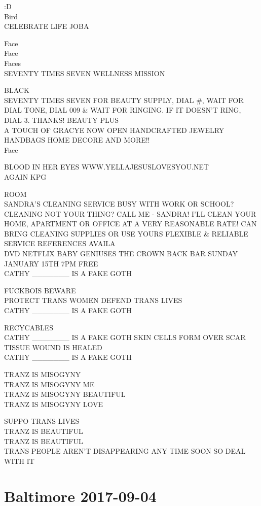 \documentclass[10pt,letterpaper]{article}
\begin{document}
:D\\
Bird\\
CELEBRATE LIFE JOBA

Face\\
Face\\
Faces\\
SEVENTY TIMES SEVEN WELLNESS MISSION

BLACK\\
SEVENTY TIMES SEVEN FOR BEAUTY SUPPLY, DIAL \#, WAIT FOR DIAL TONE, DIAL 009 \& WAIT FOR RINGING.  IF IT DOESN'T RING, DIAL 3.  THANKS!  BEAUTY PLUS\\
A TOUCH OF GRACYE NOW OPEN HANDCRAFTED JEWELRY HANDBAGS HOME DECORE AND MORE!!\\
Face

BLOOD IN HER EYES WWW.YELLAJESUSLOVESYOU.NET\\
AGAIN KPG

ROOM\\
SANDRA'S CLEANING SERVICE BUSY WITH WORK OR SCHOOL?  CLEANING NOT YOUR THING?  CALL ME {-} SANDRA!   I'LL CLEAN YOUR HOME, APARTMENT OR OFFICE AT A VERY REASONABLE RATE!  CAN BRING CLEANING SUPPLIES OR USE YOURS FLEXIBLE \& RELIABLE SERVICE REFERENCES AVAILA\\
DVD NETFLIX BABY GENIUSES THE CROWN BACK BAR SUNDAY JANUARY 15TH 7PM FREE\\
CATHY \_\_\_\_\_\_\_ IS A FAKE GOTH

FUCKBOIS BEWARE\\
PROTECT TRANS WOMEN DEFEND TRANS LIVES\\
CATHY \_\_\_\_\_\_\_ IS A FAKE GOTH

RECYCABLES\\
CATHY \_\_\_\_\_\_\_ IS A FAKE GOTH SKIN CELLS FORM OVER SCAR TISSUE WOUND IS HEALED\\
CATHY \_\_\_\_\_\_\_ IS A FAKE GOTH

TRANZ IS MISOGYNY\\
TRANZ IS MISOGYNY ME\\
TRANZ IS MISOGYNY BEAUTIFUL\\
TRANZ IS MISOGYNY LOVE

SUPPO TRANS LIVES\\
TRANZ IS BEAUTIFUL\\
TRANZ IS BEAUTIFUL\\
TRANS PEOPLE AREN'T DISAPPEARING ANY TIME SOON SO DEAL WITH IT
\pagebreak

\section*{Baltimore 2017-09-04}
\end{document}
